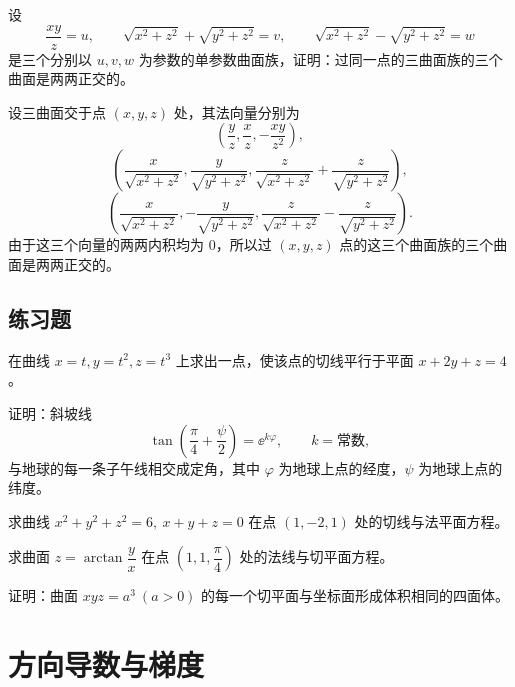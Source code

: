 \begin{xexample}[21.1.3]
设
\[
  \frac{xy}{z}=u,\qquad
  \sqrt{x^2+z^2}+\sqrt{y^2+z^2}=v,
  \qquad
  \sqrt{x^2+z^2}-\sqrt{y^2+z^2}=w
\]
是三个分别以 $u,v,w$ 为参数的单参数曲面族，证明：过同一点的三曲面族的三个曲面是两两正交的。
\end{xexample}
\begin{xproof}
设三曲面交于点 $(x,y,z)$ 处，其法向量分别为
\[
  \left(\frac{y}{z},\frac{x}{z},-\frac{xy}{z^2}\right),
\]
\[
  \left(\frac{x}{\sqrt{x^2+z^2}},
  \frac{y}{\sqrt{y^2+z^2}},
  \frac{z}{\sqrt{x^2+z^2}}+\frac{z}{\sqrt{y^2+z^2}}\right),
\]
\[
  \left(\frac{x}{\sqrt{x^2+z^2}},
  -\frac{y}{\sqrt{y^2+z^2}},
  \frac{z}{\sqrt{x^2+z^2}}-\frac{z}{\sqrt{y^2+z^2}}\right).
\]
由于这三个向量的两两内积均为 $0$，所以过 $(x,y,z)$ 点的这三个曲面族的三个曲面是两两正交的。
\end{xproof}

\subsection{练习题}
\begin{xexercise}[1]
在曲线 $x=t,y=t^2,z=t^3$ 上求出一点，使该点的切线平行于平面 $x+2y+z=4$。
\end{xexercise}

\begin{xexercise}[2]
证明：斜坡线
  \[
    \tan\left(\frac{\pi}{4}+\frac{\psi}{2}\right)=\ee^{k\varphi},\qquad k=\text{常数},
  \]
  与地球的每一条子午线相交成定角，其中 $\varphi$ 为地球上点的经度，$\psi$ 为地球上点的纬度。
\end{xexercise}

\begin{xexercise}[3]
求曲线 $x^2+y^2+z^2=6,\ x+y+z=0$ 在点 $(1,-2,1)$ 处的切线与法平面方程。
\end{xexercise}

\begin{xexercise}[4]
求曲面 $z=\arctan\dfrac{y}{x}$ 在点 $\left(1,1,\dfrac{\pi}{4}\right)$ 处的法线与切平面方程。
\end{xexercise}

\begin{xexercise}[5]
证明：曲面 $xyz=a^3\ (a>0)$ 的每一个切平面与坐标面形成体积相同的四面体。
\end{xexercise}

\section{方向导数与梯度}

